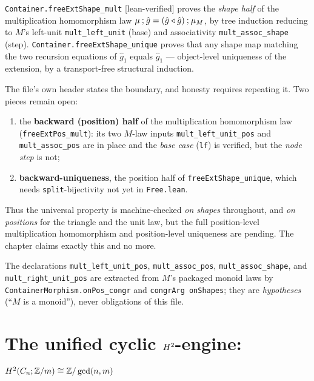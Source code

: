 \begin{theorem}
\label{thm:mult-fwd}
\texttt{Container.freeExtShape\_mult} [lean-verified] proves the \emph{shape half} of the multiplication homomorphism law $\mu\mathbin{;}\hat g=(\hat g\triangleleft\hat g)\mathbin{;}\mu_M$, by tree induction reducing to $M$'s left-unit \texttt{mult\_left\_unit} (base) and associativity \texttt{mult\_assoc\_shape} (step). \texttt{Container.freeExtShape\_unique} proves that any shape map matching the two recursion equations of $\hat g_1$ equals $\hat g_1$ --- object-level uniqueness of the extension, by a transport-free structural induction.
\end{theorem}

\begin{remark}
\label{rem:scope-universal}
The file's own header states the boundary, and honesty requires repeating it. Two pieces remain open:
\begin{enumerate}
  \item the \textbf{backward (position) half} of the multiplication homomorphism law (\texttt{freeExtPos\_mult}): its two $M$-law inputs \texttt{mult\_left\_unit\_pos} and \texttt{mult\_assoc\_pos} are in place and the \emph{base case} (\texttt{lf}) is verified, but the \emph{node step} is not;
  \item \textbf{backward-uniqueness}, the position half of \texttt{freeExtShape\_unique}, which needs \texttt{split}-bijectivity not yet in \texttt{Free.lean}.
\end{enumerate}
Thus the universal property is machine-checked \emph{on shapes} throughout, and \emph{on positions} for the triangle and the unit law, but the full position-level multiplication homomorphism and position-level uniqueness are pending. The chapter claims exactly this and no more.
\end{remark}

The declarations \texttt{mult\_left\_unit\_pos}, \texttt{mult\_assoc\_pos}, \texttt{mult\_assoc\_shape}, and \texttt{mult\_right\_unit\_pos} are extracted from $M$'s packaged monoid laws by \texttt{ContainerMorphism.onPos\_congr} and \texttt{congrArg onShapes}; they are \emph{hypotheses} (``$M$ is a monoid''), never obligations of this file.

\section{The unified cyclic $H^2$-engine: $H^2(C_n;\mathbb{Z}/m)\cong\mathbb{Z}/\gcd(n,m)$}
\label{sec:gcd-engine}

